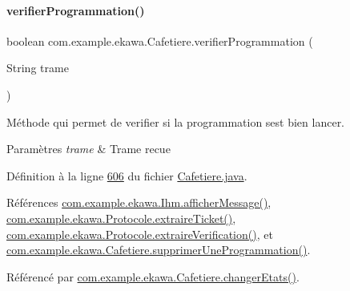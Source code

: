 \paragraph{\texorpdfstring{verifier\+Programmation()}{verifierProgrammation()}}
{\footnotesize\ttfamily boolean com.\+example.\+ekawa.\+Cafetiere.\+verifier\+Programmation (\begin{DoxyParamCaption}\item[{String}]{trame }\end{DoxyParamCaption})\hspace{0.3cm}{\ttfamily [private]}}



Méthode qui permet de verifier si la programmation s\textquotesingle{}est bien lancer. 


\begin{DoxyParams}{Paramètres}
{\em trame} & Trame recue \\
\hline
\end{DoxyParams}


Définition à la ligne \hyperlink{_cafetiere_8java_source_l00606}{606} du fichier \hyperlink{_cafetiere_8java_source}{Cafetiere.\+java}.



Références \hyperlink{_ihm_8java_source_l00964}{com.\+example.\+ekawa.\+Ihm.\+afficher\+Message()}, \hyperlink{_protocole_8java_source_l00423}{com.\+example.\+ekawa.\+Protocole.\+extraire\+Ticket()}, \hyperlink{_protocole_8java_source_l00440}{com.\+example.\+ekawa.\+Protocole.\+extraire\+Verification()}, et \hyperlink{_cafetiere_8java_source_l00820}{com.\+example.\+ekawa.\+Cafetiere.\+supprimer\+Une\+Programmation()}.



Référencé par \hyperlink{_cafetiere_8java_source_l00463}{com.\+example.\+ekawa.\+Cafetiere.\+changer\+Etats()}.


